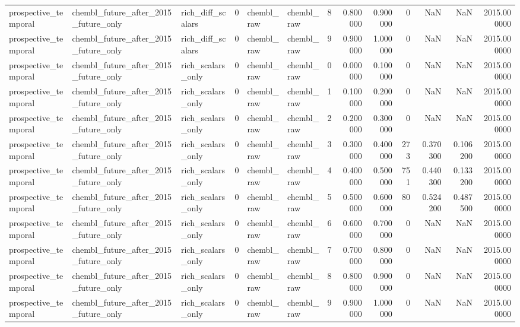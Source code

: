\begin{longtable}{lllrllrrrrrrr}
prospective\_temporal & chembl\_future\_after\_2015\_future\_only & rich\_diff\_scalars & 0 & chembl\_raw & chembl\_raw & 8 & 0.800000 & 0.900000 & 0 & NaN & NaN & 2015.000000 \\
prospective\_temporal & chembl\_future\_after\_2015\_future\_only & rich\_diff\_scalars & 0 & chembl\_raw & chembl\_raw & 9 & 0.900000 & 1.000000 & 0 & NaN & NaN & 2015.000000 \\
prospective\_temporal & chembl\_future\_after\_2015\_future\_only & rich\_scalars\_only & 0 & chembl\_raw & chembl\_raw & 0 & 0.000000 & 0.100000 & 0 & NaN & NaN & 2015.000000 \\
prospective\_temporal & chembl\_future\_after\_2015\_future\_only & rich\_scalars\_only & 0 & chembl\_raw & chembl\_raw & 1 & 0.100000 & 0.200000 & 0 & NaN & NaN & 2015.000000 \\
prospective\_temporal & chembl\_future\_after\_2015\_future\_only & rich\_scalars\_only & 0 & chembl\_raw & chembl\_raw & 2 & 0.200000 & 0.300000 & 0 & NaN & NaN & 2015.000000 \\
prospective\_temporal & chembl\_future\_after\_2015\_future\_only & rich\_scalars\_only & 0 & chembl\_raw & chembl\_raw & 3 & 0.300000 & 0.400000 & 273 & 0.370300 & 0.106200 & 2015.000000 \\
prospective\_temporal & chembl\_future\_after\_2015\_future\_only & rich\_scalars\_only & 0 & chembl\_raw & chembl\_raw & 4 & 0.400000 & 0.500000 & 751 & 0.440300 & 0.133200 & 2015.000000 \\
prospective\_temporal & chembl\_future\_after\_2015\_future\_only & rich\_scalars\_only & 0 & chembl\_raw & chembl\_raw & 5 & 0.500000 & 0.600000 & 80 & 0.524200 & 0.487500 & 2015.000000 \\
prospective\_temporal & chembl\_future\_after\_2015\_future\_only & rich\_scalars\_only & 0 & chembl\_raw & chembl\_raw & 6 & 0.600000 & 0.700000 & 0 & NaN & NaN & 2015.000000 \\
prospective\_temporal & chembl\_future\_after\_2015\_future\_only & rich\_scalars\_only & 0 & chembl\_raw & chembl\_raw & 7 & 0.700000 & 0.800000 & 0 & NaN & NaN & 2015.000000 \\
prospective\_temporal & chembl\_future\_after\_2015\_future\_only & rich\_scalars\_only & 0 & chembl\_raw & chembl\_raw & 8 & 0.800000 & 0.900000 & 0 & NaN & NaN & 2015.000000 \\
prospective\_temporal & chembl\_future\_after\_2015\_future\_only & rich\_scalars\_only & 0 & chembl\_raw & chembl\_raw & 9 & 0.900000 & 1.000000 & 0 & NaN & NaN & 2015.000000 \\

\end{longtable}
